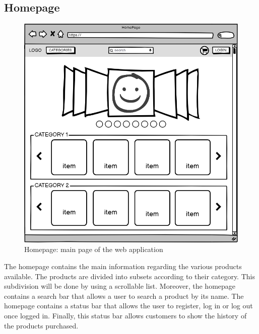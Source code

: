 \subsection{Homepage}
    \begin{figure}[H]
        \centering
        \includegraphics[width=\textwidth,height=0.7\textheight,keepaspectratio]{mockups/homepageMockup.png}
            \caption{Homepage: main page of the web application}
            \label{fig:Homepage}
    \end{figure}

The homepage contains the main information regarding the various products available.
The products are divided into subsets according to their category. This subdivision will be done by using a scrollable list. Moreover, the homepage contains a search bar that allows a user to search a product by its name.
The homepage contains a status bar that allows the user to register, log in or log out once logged in.
Finally, this status bar allows customers to show the history of the products purchased.

